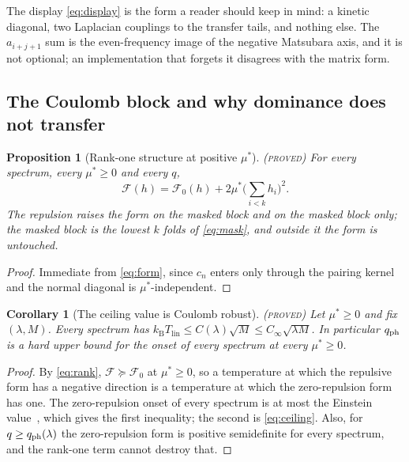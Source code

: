 \documentclass[11pt]{article}
\newcommand{\kb}{k_{\mathrm B}}
\newcommand{\Tlin}{T_{\mathrm{lin}}}
\newcommand{\Fcal}{\mathcal F}
\newcommand{\muS}{\mu^{*}}
\newtheorem{corollary}[theorem]{Corollary}
\newtheorem{proposition}[theorem]{Proposition}
\theoremstyle{definition}
\theoremstyle{remark}
\newcommand{\proved}{\textnormal{\textsc{(proved)}}}
\begin{document}
The display \eqref{eq:display} is the form a reader should keep in mind: a kinetic
diagonal, two Laplacian couplings to the transfer tails, and nothing else. The
$a_{i+j+1}$ sum is the even-frequency image of the negative Matsubara axis, and it is not
optional; an implementation that forgets it disagrees with the matrix form.

\subsection{The Coulomb block and why dominance does not transfer}

\begin{proposition}[Rank-one structure at positive $\muS$]\label{prop:rank}\proved
For every spectrum, every $\muS\ge0$ and every $q$,
\begin{equation}\label{eq:rank}
\Fcal(h)=\Fcal_0(h)+2\muS\Big(\sum_{i<k}h_i\Big)^2 .
\end{equation}
The repulsion raises the form on the masked block and on the masked block only; the
masked block is the lowest $k$ folds of \eqref{eq:mask}, and outside it the form is
untouched.
\end{proposition}
\begin{proof}
Immediate from \eqref{eq:form}, since $c_n$ enters only through the pairing kernel and the
normal diagonal is $\muS$-independent.
\end{proof}

\begin{corollary}[The ceiling value is Coulomb robust]\label{cor:value}\proved
Let $\muS\ge0$ and fix $(\lambda,M)$. Every spectrum has
$\kb\Tlin\le C(\lambda)\sqrt M\le C_\infty\sqrt{\lambda M}$. In particular $q_{\rm ph}$
is a hard upper bound for the onset of every spectrum at every $\muS\ge0$.
\end{corollary}
\begin{proof}
By \eqref{eq:rank}, $\Fcal\succeq\Fcal_0$ at $\muS\ge0$, so a temperature at which the
repulsive form has a negative direction is a temperature at which the zero-repulsion form
has one. The zero-repulsion onset of every spectrum is at most the Einstein
value~\cite{rens,kondratev}, which gives the first inequality; the second is
\eqref{eq:ceiling}. Also, for $q\ge q_{\rm ph}(\lambda)$ the zero-repulsion form is
positive semidefinite for every spectrum, and the rank-one term cannot destroy that.
\end{proof}
\end{document}
